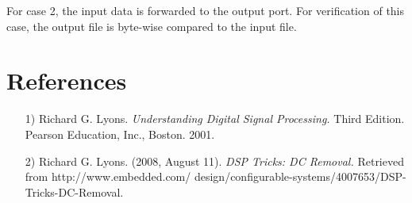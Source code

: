 \documentclass{article}
\begin{document}
	\noindent For case 2, the input data is forwarded to the output port. For verification of this case, the output file is byte-wise compared to the input file.
	\section*{References}
	\begin{flushleft}
		\begin{itemize}
			\item[1)] Richard G. Lyons. \textit{Understanding Digital Signal Processing.} Third Edition. Pearson Education, Inc., Boston. 2001.
			\item[2)] Richard G. Lyons. (2008, August 11). \textit{DSP Tricks: DC Removal.} Retrieved from http://www.embedded.com/
			      design/configurable-systems/4007653/DSP-Tricks-DC-Removal.
		\end{itemize}
	\end{flushleft}
\end{document}
